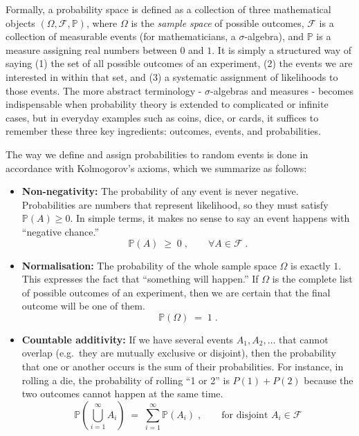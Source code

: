\documentclass{book}
\begin{document}
Formally, a probability space is defined as a collection of three mathematical objects $(\Omega, \mathcal{F}, \mathbb{P})$, where $\Omega$ is the \emph{sample space} of possible outcomes, $\mathcal{F}$ is a collection of measurable events (for mathematicians, a $\sigma$-algebra), and $\mathbb{P}$ is a measure assigning real numbers between $0$ and $1$. It is simply a structured way of saying (1) the set of all possible outcomes of an experiment, (2) the events we are interested in within that set, and (3) a systematic assignment of likelihoods to those events. The more abstract terminology - $\sigma$-algebras and measures - becomes indispensable when probability theory is extended to complicated or infinite cases, but in everyday examples such as coins, dice, or cards, it suffices to remember these three key ingredients: outcomes, events, and probabilities.

\medskip The way we define and assign probabilities to random events is done in accordance with Kolmogorov’s axioms, which we summarize as follows:

\begin{itemize}
  \item \textbf{Non-negativity:} The probability of any event is never negative. Probabilities are numbers that represent likelihood, so they must satisfy $\mathbb{P}(A) \geq 0$. In simple terms, it makes no sense to say an event happens with ``negative chance.'' 
\begin{equation}
  	\mathbb{P}(A) \;\geq\; 0 \; , \qquad \forall A \in \mathcal{F} \; .
\end{equation}

  \item \textbf{Normalisation:} The probability of the whole sample space $\Omega$ is exactly $1$. This expresses the fact that ``something will happen.'' If $\Omega$ is the complete list of possible outcomes of an experiment, then we are certain that the final outcome will be one of them.
\begin{equation}
 	\mathbb{P}(\Omega) \;=\; 1 \; .
\end{equation}

  \item \textbf{Countable additivity:} If we have several events $A_1, A_2, \ldots$ that cannot overlap (e.g.\ they are mutually exclusive or disjoint), then the probability that one or another occurs is the sum of their probabilities. For instance, in rolling a die, the probability of rolling ``1 or 2'' is $P(1)+P(2)$ because the two outcomes cannot happen at the same time. 
\begin{equation}
 	\mathbb{P}\!\left(\bigcup_{i=1}^\infty A_i\right) \;=\; \sum_{i=1}^\infty \mathbb{P}(A_i) \; ,
	\qquad \text{for disjoint } A_i \in \mathcal{F}
\end{equation}

\end{itemize}
\end{document}

